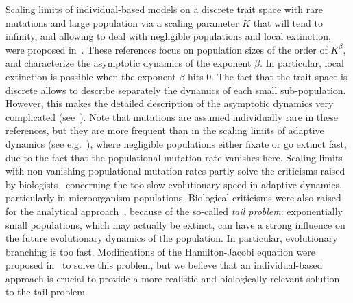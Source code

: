 \documentclass[JEP,XML,SOM,Unicode,published]{cedram}
\theoremstyle{plain}
\theoremstyle{remark}
\begin{document}
Scaling limits of individual-based models on a discrete trait space with rare mutations and large population via a scaling parameter $K$ that will tend to infinity, and allowing to deal with negligible populations and local extinction, were proposed in~\cite{durrettmayberry,Bovier2019,champagnatmeleardtran2021,coquille2021,blathpaultobias}. These references focus on population sizes of the order of $K^\beta$, and characterize the asymptotic dynamics of the exponent $\beta$. In particular, local extinction is possible when the exponent $\beta$ hits 0. The fact that the trait space is discrete allows to describe separately the dynamics of each small sub-population.
However, this makes the detailed description of the
asymptotic dynamics very complicated (see~\cite{champagnatmeleardtran2021,coquille2021}).
Note that mutations are assumed individually rare in these references, but they are more frequent than in the scaling limits of adaptive dynamics (see e.g.~\cite{metzgeritzmeszenajacobsheerwaarden,dieckmannlaw,champagnat06,champagnatmeleard2011}), where negligible populations either fixate or go extinct fast, due to the fact that the populational mutation rate vanishes here.
Scaling limits with non-vanishing populational mutation rates partly solve the criticisms raised by biologists~\cite{WaxmanGavrilets2005} concerning the too slow evolutionary speed in adaptive dynamics, particularly in microorganism populations. Biological criticisms were also raised for the analytical approach~\cite{perthame2010}, because
of the so-called {\it tail problem}: exponentially small populations, which may actu\-ally be extinct, can have a strong influence on the future evolutionary dynamics of the population. In particular, evolutionary branching is too fast.
Modifications of the Hamilton-Jacobi equation were proposed in~{\cite{perthame2010,Mirrahimi2012,jabin2012}} to solve this problem, but we believe that an individual-based approach is crucial to provide a more realistic and biologically relevant solution to the tail problem.
\end{document}
